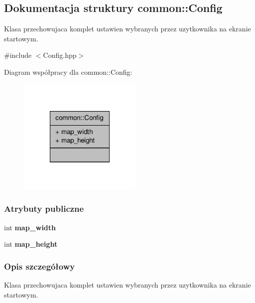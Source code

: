 \hypertarget{structcommon_1_1Config}{\subsection{Dokumentacja struktury common\-:\-:Config}
\label{structcommon_1_1Config}
}


Klasa przechowujaca komplet ustawien wybranych przez uzytkownika na ekranie startowym.  




{\ttfamily \#include $<$Config.\-hpp$>$}



Diagram współpracy dla common\-:\-:Config\-:
\nopagebreak
\begin{figure}[H]
\begin{center}
\leavevmode
\includegraphics[width=168pt]{structcommon_1_1Config__coll__graph}
\end{center}
\end{figure}
\subsubsection*{Atrybuty publiczne}
\begin{DoxyCompactItemize}
\item 
\hypertarget{structcommon_1_1Config_a0cdc7f623f9324dc884c7eeacaafb64e}{int {\bfseries map\-\_\-width}}\label{structcommon_1_1Config_a0cdc7f623f9324dc884c7eeacaafb64e}

\item 
\hypertarget{structcommon_1_1Config_a7e50e6e401ae5f70ac0a8ae2ae20f1d5}{int {\bfseries map\-\_\-height}}\label{structcommon_1_1Config_a7e50e6e401ae5f70ac0a8ae2ae20f1d5}

\end{DoxyCompactItemize}


\subsubsection{Opis szczegółowy}
Klasa przechowujaca komplet ustawien wybranych przez uzytkownika na ekranie startowym. 

